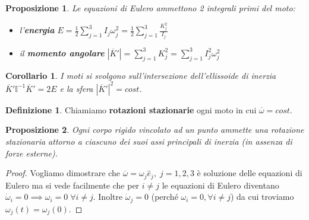 \documentclass{book}
\theoremstyle{plain}
\theoremstyle{plain}
\theoremstyle{plain}
\theoremstyle{plain}
\newtheorem*{cor}{Corollario}
\theoremstyle{plain}
\newtheorem{prop}{Proposizione}[chapter]
\theoremstyle{definition}
\newtheorem{defi}{Definizione}[chapter]
\theoremstyle{remark}
\theoremstyle{definition}
\begin{document}
\begin{prop}
\everymath{\displaystyle}
    Le equazioni di Eulero ammettono 2 integrali primi del moto:
    \begin{itemize}
        \item l'\textbf{energia} $E=\frac{1}{2}\sum_{j=1}^3I_j\omega_j^2 = \frac{1}{2}\sum_{j=1}^3\frac{K_j^2}{I_j}$
        \item il \textbf{momento angolare} $|\overline{K}'|=\sum_{j=1}^3 K_j^2=\sum_{j=1}^3I_j^2\omega_j^2$
    \end{itemize}
\end{prop}

\begin{cor}
    I moti si svolgono sull'intersezione dell'ellissoide di inerzia $\overline{K}'\mathbb{I}^{-1}\overline{K}'=2E$ e la sfera $|\overline{K}'|^2=cost$.
\end{cor}

\begin{defi}
    Chiamiamo \textbf{rotazioni stazionarie} ogni moto in cui $\overline{\omega}=cost$.
\end{defi}

\begin{prop}
    Ogni corpo rigido vincolato ad un punto ammette una rotazione stazionaria attorno a ciascuno dei suoi assi principali di inerzia (in assenza di forze esterne).
\end{prop}

\begin{proof}
    Vogliamo dimostrare che $\overline{\omega}=\omega_j\hat{e}_j,\;j=1, 2, 3$ è soluzione delle equazioni di Eulero ma si vede facilmente che per $i\neq j$ le equazioni di Eulero diventano $\Dot{\omega}_i=0\implies\omega_i=0 \;\forall i\neq j$. Inoltre $\Dot{\omega}_j=0$ (perché $\omega_i=0, \forall i\neq j$) da cui troviamo $\omega_j(t)=\omega_j(0)$.
\end{proof}
\end{document}
